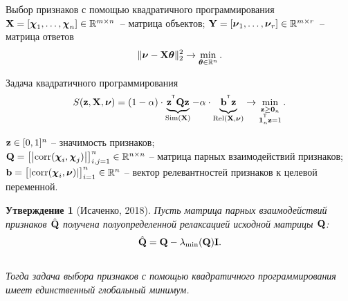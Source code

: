 \documentclass[10pt]{beamer}
\newtheorem{statement}{Утверждение}
\begin{document}
\begin{frame}{Выбор признаков с помощью квадратичного программирования}
	$\mathbf{X} = [\boldsymbol{\chi}_1, \dots, \boldsymbol{\chi}_n] \in \mathbb{R}^{m \times n}$~-- матрица объектов; $\mathbf{Y} = [\boldsymbol{\nu}_1, \dots, \boldsymbol{\nu}_r] \in \mathbb{R}^{m \times r}$~-- матрица ответов
	\[
	\| \boldsymbol{\nu} - \mathbf{X} \boldsymbol{\theta}\|_2^2 \rightarrow\min_{\boldsymbol{\theta} \in \mathbb{R}^{n}}.
	\]
	\vspace{-0.3cm}
	\begin{block}{Задача квадратичного программирования}
	\vspace{-0.3cm}
	\[
	S(\mathbf{z}, \mathbf{X}, \boldsymbol{\nu}) = (1 - \alpha) \cdot \underbrace{\mathbf{z}^{^{\text{\tiny\sffamily\upshape\mdseries T}}} \mathbf{Q} \mathbf{z}}_{\text{Sim}(\mathbf{X})} - \alpha \cdot \underbrace{\vphantom{()} \mathbf{b}^{^{\text{\tiny\sffamily\upshape\mdseries T}}} \mathbf{z}}_{\text{Rel}(\mathbf{X}, \boldsymbol{\nu})} \rightarrow \min_{\substack{\mathbf{z} \geq \boldsymbol{0}_n \\ \boldsymbol{1}_n^{^{\text{\tiny\sffamily\upshape\mdseries T}}} \mathbf{z}=1}}.
	\]
	\vspace{-0.5cm}
	\end{block}
		$\mathbf{z} \in [0, 1]^n$ -- значимость признаков; \\
		$\mathbf{Q} = \bigl[\left|\text{corr}(\boldsymbol{\chi}_i, \boldsymbol{\chi}_j)\right|\bigr]_{i,j=1}^n \in \mathbb{R}^{n \times n}$ -- матрица парных взаимодействий признаков; \\
		$\mathbf{b} = \bigl[\left|\text{corr}(\boldsymbol{\chi}_i, \boldsymbol{\nu})\right|\bigr]_{i=1}^n \in \mathbb{R}^n$ -- вектор релевантностей признаков к целевой переменной. 
\begin{statement}[Исаченко, 2018]
	Пусть матрица парных взаимодействий признаков $\hat{\mathbf{Q}}$ получена полуопределенной релаксацией исходной матрицы $\mathbf{Q}$:
	\vspace{-0.2cm}
	\begin{equation*}
		\hat{\mathbf{Q}} = \mathbf{Q} - \lambda_{\min}(\mathbf{Q}) \mathbf{I}.
	\end{equation*}
	\vspace{-0.7cm} \\
	Тогда задача выбора признаков с помощью квадратичного программирования имеет единственный глобальный минимум.
\end{statement}
\end{frame}
\end{document}
